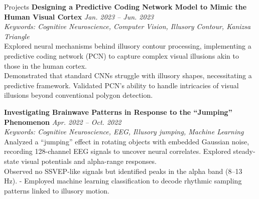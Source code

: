 \documentclass{resume}
\begin{document}
\begin{rSection}{Projects}
\bigskip
\textbf{Designing a Predictive Coding Network Model to Mimic the Human Visual Cortex} \hfill \textit{Jan. 2023 -- Jun. 2023} \\
\textit{Keywords: Cognitive Neuroscience, Computer Vision, Illusory Contour, Kanizsa Triangle}  \\
\hspace*{1em} Explored neural mechanisms behind illusory contour processing, implementing a predictive coding network (PCN) to capture complex visual illusions akin to those in the human cortex. \\
\hspace*{1em} Demonstrated that standard CNNs struggle with illusory shapes, necessitating a predictive framework.  
\hspace*{1em} Validated PCN’s ability to handle intricacies of visual illusions beyond conventional polygon detection.

\bigskip
\textbf{Investigating Brainwave Patterns in Response to the “Jumping” Phenomenon} \hfill \textit{Apr. 2022 -- Oct. 2022} \\
\textit{Keywords: Cognitive Neuroscience, EEG, Illusory jumping, Machine Learning}  \\
\hspace*{1em} Analyzed a “jumping” effect in rotating objects with embedded Gaussian noise, recording 128-channel EEG signals to uncover neural correlates. Explored steady-state visual potentials and alpha-range responses. \\
\hspace*{1em} Observed no SSVEP-like signals but identified peaks in the alpha band (8–13 Hz).  
- Employed machine learning classification to decode rhythmic sampling patterns linked to illusory motion.

\end{rSection}
\end{document}
